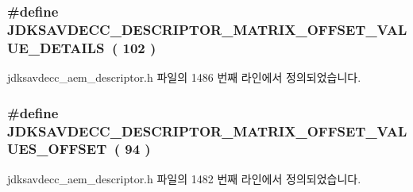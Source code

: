\subsubsection[{\texorpdfstring{J\+D\+K\+S\+A\+V\+D\+E\+C\+C\+\_\+\+D\+E\+S\+C\+R\+I\+P\+T\+O\+R\+\_\+\+M\+A\+T\+R\+I\+X\+\_\+\+O\+F\+F\+S\+E\+T\+\_\+\+V\+A\+L\+U\+E\+\_\+\+D\+E\+T\+A\+I\+LS}{JDKSAVDECC_DESCRIPTOR_MATRIX_OFFSET_VALUE_DETAILS}}]{\setlength{\rightskip}{0pt plus 5cm}\#define J\+D\+K\+S\+A\+V\+D\+E\+C\+C\+\_\+\+D\+E\+S\+C\+R\+I\+P\+T\+O\+R\+\_\+\+M\+A\+T\+R\+I\+X\+\_\+\+O\+F\+F\+S\+E\+T\+\_\+\+V\+A\+L\+U\+E\+\_\+\+D\+E\+T\+A\+I\+LS~( 102 )}\hypertarget{group__descriptor__matrix_ga88f55487bfc837a14f7ad5f28572f835}{}\label{group__descriptor__matrix_ga88f55487bfc837a14f7ad5f28572f835}


jdksavdecc\+\_\+aem\+\_\+descriptor.\+h 파일의 1486 번째 라인에서 정의되었습니다.

\subsubsection[{\texorpdfstring{J\+D\+K\+S\+A\+V\+D\+E\+C\+C\+\_\+\+D\+E\+S\+C\+R\+I\+P\+T\+O\+R\+\_\+\+M\+A\+T\+R\+I\+X\+\_\+\+O\+F\+F\+S\+E\+T\+\_\+\+V\+A\+L\+U\+E\+S\+\_\+\+O\+F\+F\+S\+ET}{JDKSAVDECC_DESCRIPTOR_MATRIX_OFFSET_VALUES_OFFSET}}]{\setlength{\rightskip}{0pt plus 5cm}\#define J\+D\+K\+S\+A\+V\+D\+E\+C\+C\+\_\+\+D\+E\+S\+C\+R\+I\+P\+T\+O\+R\+\_\+\+M\+A\+T\+R\+I\+X\+\_\+\+O\+F\+F\+S\+E\+T\+\_\+\+V\+A\+L\+U\+E\+S\+\_\+\+O\+F\+F\+S\+ET~( 94 )}\hypertarget{group__descriptor__matrix_ga846b2308b3aa290d49d13217c3055663}{}\label{group__descriptor__matrix_ga846b2308b3aa290d49d13217c3055663}


jdksavdecc\+\_\+aem\+\_\+descriptor.\+h 파일의 1482 번째 라인에서 정의되었습니다.

